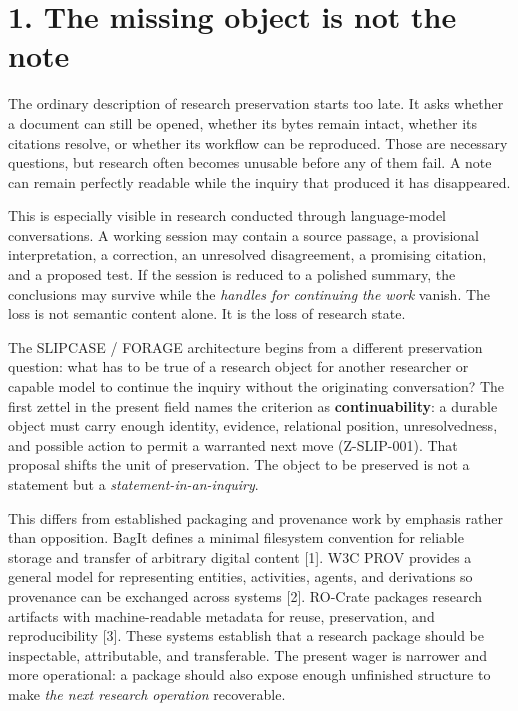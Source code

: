 \documentclass[
  11pt,
]{article}
\begin{document}
\section{1. The missing object is not the
note}\label{the-missing-object-is-not-the-note}

The ordinary description of research preservation starts too late. It
asks whether a document can still be opened, whether its bytes remain
intact, whether its citations resolve, or whether its workflow can be
reproduced. Those are necessary questions, but research often becomes
unusable before any of them fail. A note can remain perfectly readable
while the inquiry that produced it has disappeared.

This is especially visible in research conducted through language-model
conversations. A working session may contain a source passage, a
provisional interpretation, a correction, an unresolved disagreement, a
promising citation, and a proposed test. If the session is reduced to a
polished summary, the conclusions may survive while the \emph{handles
for continuing the work} vanish. The loss is not semantic content alone.
It is the loss of research state.

The SLIPCASE / FORAGE architecture begins from a different preservation
question: what has to be true of a research object for another
researcher or capable model to continue the inquiry without the
originating conversation? The first zettel in the present field names
the criterion as \textbf{continuability}: a durable object must carry
enough identity, evidence, relational position, unresolvedness, and
possible action to permit a warranted next move (Z-SLIP-001). That
proposal shifts the unit of preservation. The object to be preserved is
not a statement but a \emph{statement-in-an-inquiry}.

This differs from established packaging and provenance work by emphasis
rather than opposition. BagIt defines a minimal filesystem convention
for reliable storage and transfer of arbitrary digital content {[}1{]}.
W3C PROV provides a general model for representing entities, activities,
agents, and derivations so provenance can be exchanged across systems
{[}2{]}. RO-Crate packages research artifacts with machine-readable
metadata for reuse, preservation, and reproducibility {[}3{]}. These
systems establish that a research package should be inspectable,
attributable, and transferable. The present wager is narrower and more
operational: a package should also expose enough unfinished structure to
make \emph{the next research operation} recoverable.
\end{document}

